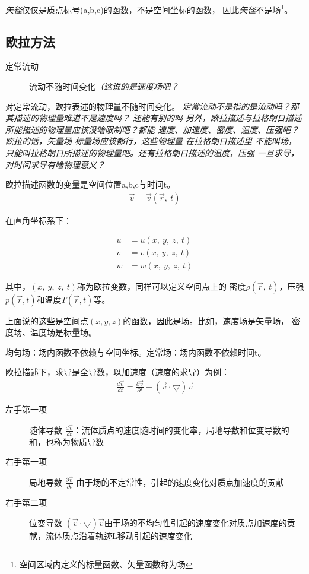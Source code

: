 \documentclass[UTF8,12pt]{article}
\begin{document}
\emph{矢径}仅仅是质点标号(a,b,c)的函数，不是空间坐标的函数，
因此\emph{矢径}不是场\footnote{空间区域内定义的标量函数、矢量函数称为场}。

\subsection{欧拉方法}

\begin{description}
    \item[定常流动] 流动不随时间变化\emph{（这说的是速度场吧？}
\end{description}

对定常流动，欧拉表述的物理量不随时间变化。
\emph{定常流动不是指的是流动吗？那其描述的物理量难道不是速度吗？{\color{red} 还能有别的吗}}
\emph{另外，欧拉描述与拉格朗日描述所能描述的物理量应该没啥限制吧？都能
速度、加速度、密度、温度、压强吧？欧拉的话，矢量场 标量场应该都行，这些物理量
在拉格朗日描述里 不能叫场，只能叫拉格朗日所描述的物理量吧。还有拉格朗日描述的温度，压强
一旦求导，对时间求导有啥物理意义？}

欧拉描述函数的变量是空间位置a,b,c与时间t。
\begin{align*}
    \vec v = \vec v(\vec r,~t)
\end{align*}

在直角坐标系下：

\begin{align*}
    u &= u(x,~y,~z,~t)\\
    v &= v(x,~y,~z,~t)\\
    w &= w(x,~y,~z,~t)
\end{align*}

其中，$(x,~y,~z,~t)$称为欧拉变数，同样可以定义空间点上的
密度$\rho(\vec r,~t)$，压强$p(\vec r,t)$和温度$T(\vec r,t)$等。

上面说的这些是空间点$(x,y,z)$的函数，因此是场。比如，速度场是矢量场，
密度场、温度场是标量场。

均匀场：场内函数不依赖与空间坐标。定常场：场内函数不依赖时间t。

欧拉描述下，求导是全导数，以加速度（速度的求导）为例：
\begin{align*}
    \frac{d\vec v}{dt} = \frac{\partial \vec v}{\partial t} + (\vec v \cdot \bigtriangledown) \vec v
\end{align*}
\begin{description}
    \item[左手第一项] 随体导数 $\frac{d\vec v}{dt}$：流体质点的速度随时间的变化率，局地导数和位变导数的和，也称为物质导数
    \item[右手第一项] 局地导数 $\frac{\partial \vec v}{\partial t}$ 由于场的不定常性，引起的速度变化对质点加速度的贡献
    \item[右手第二项] 位变导数 $(\vec v \cdot \bigtriangledown) \vec v$由于场的不均匀性引起的速度变化对质点加速度的贡献，流体质点沿着轨迹L移动引起的速度变化
\end{description}
\end{document}
